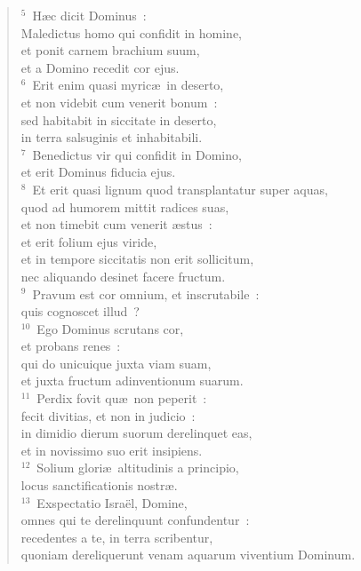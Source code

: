 \begin{flushleft}\begin{verse}${}^{5}$~H\ae c dicit Dominus~:\\ Maledictus homo qui confidit in homine,\\ et ponit carnem brachium suum,\\ et a Domino recedit cor ejus.\\
${}^{6}$~Erit enim quasi myric\ae\ in deserto,\\ et non videbit cum venerit bonum~:\\ sed habitabit in siccitate in deserto,\\ in terra salsuginis et inhabitabili.\\
${}^{7}$~Benedictus vir qui confidit in Domino,\\ et erit Dominus fiducia ejus.\\
${}^{8}$~Et erit quasi lignum quod transplantatur super aquas,\\ quod ad humorem mittit radices suas,\\ et non timebit cum venerit \ae stus~:\\ et erit folium ejus viride,\\ et in tempore siccitatis non erit sollicitum,\\ nec aliquando desinet facere fructum.\\
${}^{9}$~Pravum est cor omnium, et inscrutabile~:\\ quis cognoscet illud~?\\
${}^{10}$~Ego Dominus scrutans cor,\\ et probans renes~:\\ qui do unicuique juxta viam suam,\\ et juxta fructum adinventionum suarum.\\
${}^{11}$~Perdix fovit qu\ae\ non peperit~:\\ fecit divitias, et non in judicio~:\\ in dimidio dierum suorum derelinquet eas,\\ et in novissimo suo erit insipiens.\\
${}^{12}$~Solium glori\ae\ altitudinis a principio,\\ locus sanctificationis nostr\ae .\\
${}^{13}$~Exspectatio Isra\"el, Domine,\\ omnes qui te derelinquunt confundentur~:\\ recedentes a te, in terra scribentur,\\ quoniam dereliquerunt venam aquarum viventium Dominum.\\

\end{verse}
\end{flushleft}
